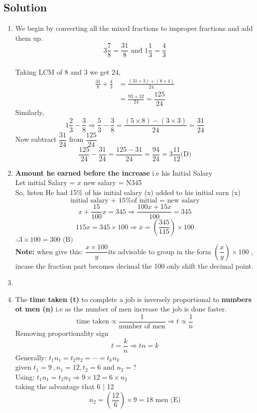 \subsection{Solution}
\begin{multicols}{2}
\begin{enumerate}[label={\textbf{\arabic*.}}]
    \item We begin by converting all the mixed fractions to improper fractions and add them up.\\
    \[3\dfrac{7}{8} = \dfrac{31}{8} \text { and } 1\dfrac{1}{3} = \dfrac{4}{3}\] \\ 
    Taking LCM of \(8\) and \(3\) we get \(24\),
    \begin{align*}
    \frac{31}{8} + \frac{4}{3} &= \frac{(31 \times 3) + (8 \times 4) }{24} \\
    &= \frac{93 + 32}{24} = \dfrac{125}{24}
    \end{align*}
    Similarly, 
    \[1\frac{2}{3} - \frac{3}{8} \Rightarrow \frac{5}{3} - \frac{3}{8} = \frac{(5 \times 8) - (3 \times 3)}{24} = \frac{31}{24}\]
    Now subtract \(\dfrac{31}{24} \text { from } \dfrac{125}{24}\)
    \[\frac{125}{24} - \frac{31}{24} = \frac{125 - 31}{24} = \frac{94}{24} = 3\frac{11}{12} \text{(D)} \]
    
    \item \textbf{Amount he earned before the increase} i.e his Initial Salary \\
    Let initial Salary = \(x\) \hspace {10px}  new salary = N345\\
    So, listen He had 15\% of his initial salary (x) added to his initial earn (x)
    \[\text{initial salary + 15\% of initial = new salary}\]
    \[x + \dfrac{15}{100}x = 345 \Rightarrow \dfrac{100x + 15x}{100} = 345\]
    \[115x = 345 \times 100 \Rightarrow x = \left(\frac{345}{115}\right) \times 100\]
    \(\therefore 3 \times 100 = 300 \text{ (B)}\)\\
    \textbf{Note:} when give this: \( \dfrac{x \times 100}{y}\)its advisable to group in the form
    \(\left(\dfrac{x}{y}\right) \times 100\) , incase the fraction part becomes decimal the 100 only shift the
    decimal point. 

    \item
    \item The \textbf{time taken (t)} to complete a job is inversely proportional to \textbf{numbers ot men (n)} 
    i.e as the number of men increase the job is done faster. 
    \begin{equation}
        \text{time taken} \propto \dfrac{1}{\text{number of men}} \Rightarrow t \propto \dfrac{1}{n}
    \end {equation}
    Removing proportionality sign
    \[t = \dfrac{k}{n} \Rightarrow tn = k\]
    Generally: \(t_{1}n_{1} = t_{2}n_2 = \cdots = t_{k}n_{k}\)\\
    given \(t_{1} = 9\ , n_{1} = 12 , t_{2} = 6 \text{ and } n_{2} = ?\) \\
    Using: \(t_{1}n_{1} = t_{2}n_{2} \Rightarrow 9 \times 12 = 6 \times n_{2}\) \\
    taking the advantage that 6 $\mid$ 12 
    \[n_{2} = \left(\frac{12}{6}\right) \times 9 = 18 \text { men (E)}\]


\end{enumerate}
\end{multicols}
